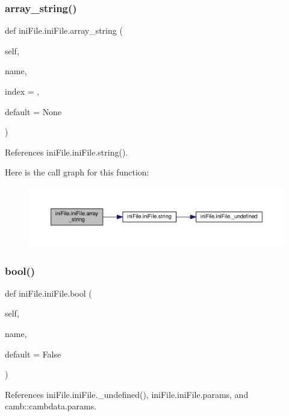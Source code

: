 \subsubsection{\texorpdfstring{array\+\_\+string()}{array\_string()}}
{\footnotesize\ttfamily def ini\+File.\+ini\+File.\+array\+\_\+string (\begin{DoxyParamCaption}\item[{}]{self,  }\item[{}]{name,  }\item[{}]{index = {},  }\item[{}]{default = {\ttfamily None} }\end{DoxyParamCaption})}



References ini\+File.\+ini\+File.\+string().

Here is the call graph for this function\+:
\nopagebreak
\begin{figure}[H]
\begin{center}
\leavevmode
\includegraphics[width=350pt]{classiniFile_1_1iniFile_a7f2eb7ebbb9192e7fb7ecefe01133444_cgraph}
\end{center}
\end{figure}
\mbox{\label{classiniFile_1_1iniFile_a9b2217762990e4d84c0d5f4de5fdd276}} 
\subsubsection{\texorpdfstring{bool()}{bool()}}
{\footnotesize\ttfamily def ini\+File.\+ini\+File.\+bool (\begin{DoxyParamCaption}\item[{}]{self,  }\item[{}]{name,  }\item[{}]{default = {\ttfamily False} }\end{DoxyParamCaption})}



References ini\+File.\+ini\+File.\+\_\+undefined(), ini\+File.\+ini\+File.\+params, and camb\+::cambdata.\+params.



